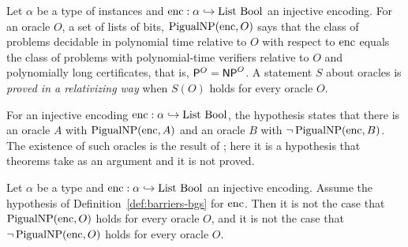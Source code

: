 \begin{definition}[$\mathsf{P}^O = \mathsf{NP}^O$ and proofs that give a statement at every oracle, for a coded set of instances]
  \label{def:barriers-pnp-oracle}
  \leanok
  Let $\alpha$ be a type of instances and $\mathrm{enc} : \alpha \hookrightarrow \mathrm{List}\ \mathrm{Bool}$
  an injective encoding. For an oracle $O$, a set of lists of bits, $\mathrm{PigualNP}(\mathrm{enc}, O)$
  says that the class of problems decidable in polynomial time relative to $O$ with respect to
  $\mathrm{enc}$ equals the class of problems with polynomial-time verifiers relative to $O$ and
  polynomially long certificates, that is, $\mathsf{P}^O = \mathsf{NP}^O$. A statement $S$ about oracles is
  \emph{proved in a relativizing way} when $S(O)$ holds for every oracle $O$.
  \own{}
\end{definition}

\begin{definition}[Hypothesis: there are an oracle with $\mathsf{P}^A = \mathsf{NP}^A$ and an oracle with $\mathsf{P}^B \ne \mathsf{NP}^B$]
  \label{def:barriers-bgs}
  \leanok
  For an injective encoding $\mathrm{enc} : \alpha \hookrightarrow \mathrm{List}\ \mathrm{Bool}$, the
  hypothesis states that there is an oracle $A$ with $\mathrm{PigualNP}(\mathrm{enc}, A)$ and an oracle
  $B$ with $\neg\,\mathrm{PigualNP}(\mathrm{enc}, B)$. The existence of such oracles is the result of
  \cite{BGS75}; here it is a hypothesis that theorems take as an argument and it is not proved.
  \own{}
\end{definition}

\begin{theorem}[No proof that gives the same answer at every oracle settles $\mathsf{P}^O = \mathsf{NP}^O$, assuming the oracles]
  \label{thm:barriers-ninguna-relativizada}
  \leanok
  Let $\alpha$ be a type and $\mathrm{enc} : \alpha \hookrightarrow \mathrm{List}\ \mathrm{Bool}$ an
  injective encoding. Assume the hypothesis of Definition~\ref{def:barriers-bgs} for $\mathrm{enc}$. Then
  it is not the case that $\mathrm{PigualNP}(\mathrm{enc}, O)$ holds for every oracle $O$, and it is not
  the case that $\neg\,\mathrm{PigualNP}(\mathrm{enc}, O)$ holds for every oracle $O$.
  \own{}
\end{theorem}

